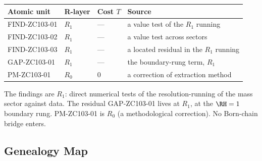 \documentclass[12pt, a4paper]{article}
\begin{document}
\begin{layerbox}[title={R-Layer Assignments for ZC103}]
{\small\renewcommand{\arraystretch}{1.25}
\begin{center}
\begin{tabular}{@{}llll@{}}
\toprule
Atomic unit & R-layer & Cost $T$ & Source \\
\midrule
FIND-ZC103-01 & $R_1$ & --- & a value test of the $R_1$ running \\
FIND-ZC103-02 & $R_1$ & --- & a value test across sectors \\
FIND-ZC103-03 & $R_1$ & --- & a located residual in the $R_1$ running \\
GAP-ZC103-01  & $R_1$ & --- & the boundary-rung term, $R_1$ \\
PM-ZC103-01   & $R_0$ & $0$ & a correction of extraction method \\
\bottomrule
\end{tabular}
\end{center}}
The findings are $R_1$: direct numerical tests of the resolution-running of the
mass sector against data. The residual GAP-ZC103-01 lives at $R_1$, at the
$\RH=1$ boundary rung. PM-ZC103-01 is $R_0$ (a methodological correction). No
Born-chain bridge enters.
\end{layerbox}

\subsection{Genealogy Map}
\label{sec:genealogy-zc103}
\end{document}
